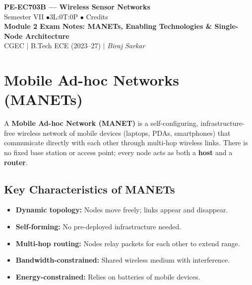 \documentclass[12pt,a4paper]{article}
\begin{document}

\begin{center}
  {\LARGE\bfseries\color{myred} PE-EC703B --- Wireless Sensor Networks}\\[5pt]
  {\normalsize\color{mydark} Semester VII \quad$\bullet$\quad 3L:0T:0P \quad$\bullet$ Credits}\\[3pt]
  {\normalsize\color{myteal}\textbf{Module 2 Exam Notes: MANETs, Enabling Technologies \& Single-Node Architecture}}\\[3pt]
  {\small\color{mydark} CGEC \;$|$\; B.Tech ECE (2023--27) \;$|$\; \textit{Biraj Sarkar}}
\end{center}
\vspace{2pt}
\noindent{\color{myred}\rule{\linewidth}{1.5pt}}
\vspace{2pt}

\hypersetup{linkcolor=mydark}
\tableofcontents
\hypersetup{linkcolor=myteal}
\newpage

\section{Mobile Ad-hoc Networks (MANETs)}

\begin{tcolorbox}[defbox, title={\textbf{MANET --- Definition}}]
A \textbf{Mobile Ad-hoc Network (MANET)} is a self-configuring, infrastructure-free wireless network of mobile devices (laptops, PDAs, smartphones) that communicate directly with each other through multi-hop wireless links. There is no fixed base station or access point; every node acts as both a \textbf{host} and a \textbf{router}.
\end{tcolorbox}

\subsection{Key Characteristics of MANETs}
\begin{itemize}[leftmargin=*, itemsep=3pt]
  \item \textbf{Dynamic topology:} Nodes move freely; links appear and disappear.
  \item \textbf{Self-forming:} No pre-deployed infrastructure needed.
  \item \textbf{Multi-hop routing:} Nodes relay packets for each other to extend range.
  \item \textbf{Bandwidth-constrained:} Shared wireless medium with interference.
  \item \textbf{Energy-constrained:} Relies on batteries of mobile devices.
\end{itemize}
\end{document}
